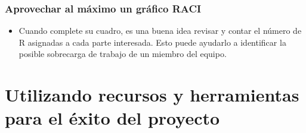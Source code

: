 \documentclass[10pt]{book}
\begin{document}
	\subsection{Aprovechar al máximo un gráfico RACI}
	\begin{itemize}
	    \item Cuando complete su cuadro, es una buena idea revisar y contar el número de R asignadas a cada parte interesada. Esto puede ayudarlo a identificar la posible sobrecarga de trabajo de un miembro del equipo. 
	\end{itemize}



\chapter{Utilizando recursos y herramientas para el éxito del proyecto}
\end{document}
